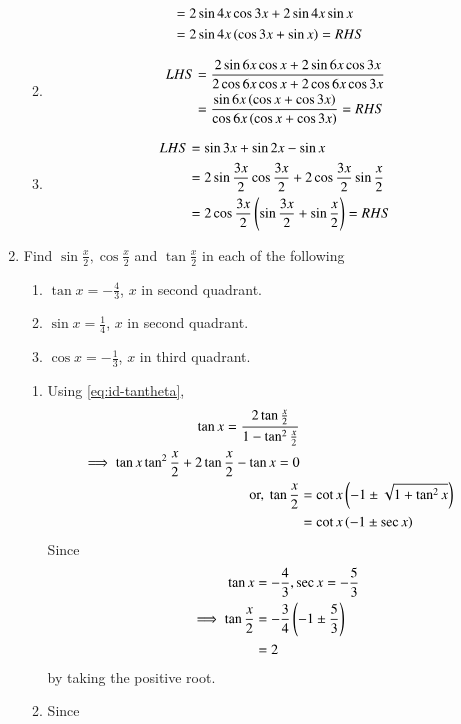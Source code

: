 \begin{enumerate}[label=\thesubsection.\arabic*,ref=\thesubsection.\theenumi,itemsep=1ex]
\begin{enumerate}
\begin{align}
\\
	&=
2\sin 4x\cos3x+2\sin4x\sin x
\\
	&=
	2\sin 4x\left(\cos3x+\sin x\right)=RHS
\end{align}
\item 
\begin{align}
	LHS&=\frac{2\sin6x\cos x+2\sin6x\cos3x}{2\cos6x\cos x+2\cos6x\cos3x}
	\\
	&=\frac{\sin6x\left(\cos x+\cos3x\right)}{\cos6x\left(\cos x+\cos3x\right)}
	=RHS
\end{align}
\item 
\begin{align}
	LHS &= \sin3x+\sin2x-\sin x
	\\
	 &= 2\sin\frac{3x}{2}\cos\frac{3x}{2}+2\cos\frac{3x}{2}\sin\frac{x}{2}
	\\
	 &= 2\cos\frac{3x}{2}\left(\sin\frac{3x}{2}+\sin\frac{x}{2}\right) = RHS
\end{align}
\end{enumerate}
\item Find $\sin\frac{x}{2},\cos\frac{x}{2}$ and $\tan\frac{x}{2}$ in each of the following
\begin{enumerate}
\item $\tan x=-\frac{4}{3}$, $x$  in second quadrant. 
\item $\sin x=\frac{1}{4}$, $x$   in second quadrant.
\item $\cos x=-\frac{1}{3}$, $x$  in third quadrant.
\end{enumerate}
\solution
\begin{enumerate}
\item  Using
\eqref{eq:id-tantheta},
\begin{align}
	\tan {x} = \frac{2\tan \frac{x}{2}}{1-\tan^2\frac{x}{2}}
	\\
	\implies 
\tan {x}	\tan^2\frac{x}{2}+2\tan \frac{x}{2}-\tan {x}   = 0
	\\
	\text{or, }  \tan \frac{x}{2} &= \cot x\left(-1 \pm \sqrt{1 + \tan^2 x}\right)
	\\
	&=\cot x\left(-1 \pm \sec x\right)
\end{align}
Since 
\begin{align}
	\tan x &= -\frac{4}{3}, \sec x = -\frac{5}{3}
	\\
	\implies \tan \frac{x}{2} &= -\frac{3}{4}\left(-1\pm\frac{5}{3}\right)
	\\
	&= 2
\end{align}
by taking the positive root.
\item 
	Since
\begin{align}

\end{align}
\end{enumerate}
\end{enumerate}
